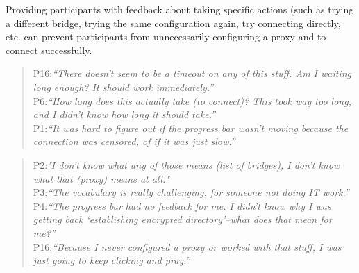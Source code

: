 \documentclass{template}
\begin{document}
Providing participants with feedback about taking specific actions (such as trying a different bridge, trying the same configuration again, try connecting directly, etc. can prevent participants from unnecessarily configuring a proxy and to connect successfully. \\

\begin{quotation}
\noindent P16:\textit{``There doesn't seem to be a timeout on any of this stuff. Am I waiting long enough? It should work immediately.''}\\

\noindent P6:\textit{``How long does this actually take (to connect)? This took way too long, and I didn't know how long it should take.''}\\

\noindent P1:\textit{``It was hard to figure out if the progress bar wasn't moving because the connection was censored, of if it was just slow.''}\\
\end{quotation}

\begin{quotation}
\noindent P2:\textit{"I don't know what any of those means (list of bridges), I don't know what that (proxy)
 means at all."}\\
 
 \noindent P3:\textit{``The vocabulary is really challenging, for someone not doing IT work.''}\\
 
 \noindent P4:\textit{``The progress bar had no feedback for me. I didn't know why I was getting back `establishing encrypted directory'--what does that mean for me?''}\\
 
 \noindent P16:\textit{``Because I never configured a proxy or worked with that stuff, I was just going to keep clicking and pray.''}
\end{quotation} 

\end{document}
